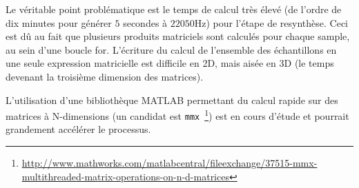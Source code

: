 Le véritable point problématique est le temps de calcul très élevé (de l'ordre
de dix minutes pour générer \( 5 \) secondes à \( \si{22050\hertz{}} \))
pour l'étape de resynthèse. Ceci est dû au fait que plusieurs produits
matriciels sont calculés pour chaque sample, au sein d'une boucle for.
L'écriture du calcul de l'ensemble des échantillons en une seule expression
matricielle est difficile en 2D, mais aisée en 3D (le temps devenant la
troisième dimension des matrices).

  L'utilisation d'une bibliothèque MATLAB permettant du calcul rapide sur
des matrices à N-dimensions (un candidat est
\texttt{mmx}~\footnote{%
\url{http://www.mathworks.com/matlabcentral/fileexchange/37515-mmx-multithreaded-matrix-operations-on-n-d-matrices}})
est en cours d'étude et pourrait grandement accélérer le processus.


